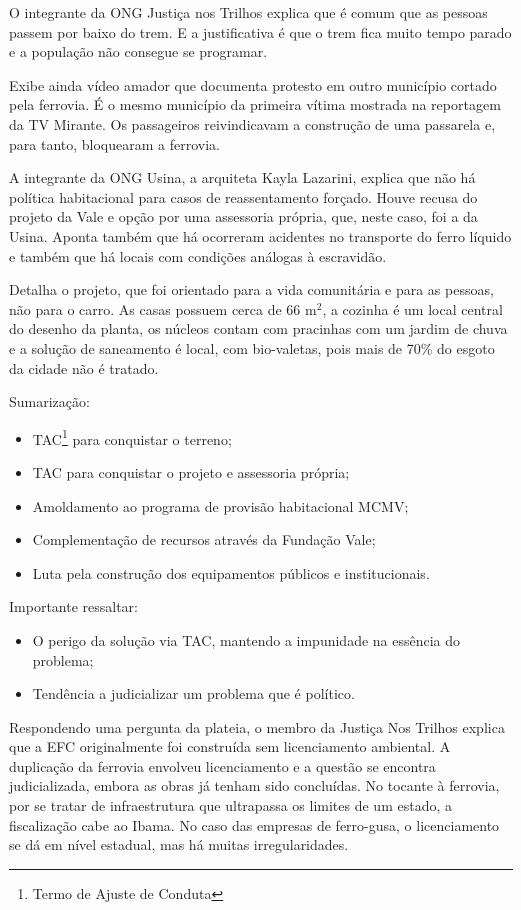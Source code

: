 \documentclass[
article,			%
11pt,				%
oneside,			%
a4paper,			%
english,			%
brazil,				%
sumario=tradicional
]{abntex2}
\begin{document}
	O integrante da ONG Justiça nos Trilhos explica que é comum que as pessoas passem por baixo do trem. E a justificativa é que o trem fica muito tempo parado e a população não consegue se programar.
	
	Exibe ainda vídeo amador que documenta protesto em outro município cortado pela ferrovia. É o mesmo município da primeira vítima mostrada na reportagem da TV Mirante. Os passageiros reivindicavam a construção de uma passarela e, para tanto, bloquearam a ferrovia.
	
	A integrante da ONG Usina, a arquiteta Kayla Lazarini, explica que não há política habitacional para casos de reassentamento forçado. Houve recusa do projeto da Vale e opção por uma assessoria própria, que, neste caso, foi a da Usina. Aponta também que há ocorreram acidentes no transporte do ferro líquido e também que há locais com condições análogas à escravidão.
	
	Detalha o projeto, que foi orientado para a vida comunitária e para as pessoas, não para o carro. As casas possuem cerca de 66 m$^{2}$, a cozinha é um local central do desenho da planta, os núcleos contam com pracinhas com um jardim de chuva e a solução de saneamento é local, com bio-valetas, pois mais de 70\% do esgoto da cidade não é tratado.
	
	Sumarização:
	\begin{itemize}
		\item TAC\footnote{Termo de Ajuste de Conduta} para conquistar o terreno;
		\item TAC para conquistar o projeto e assessoria própria;
		\item Amoldamento ao programa de provisão habitacional MCMV;
		\item Complementação de recursos através da Fundação Vale;
		\item Luta pela construção dos equipamentos públicos e institucionais.
	\end{itemize}
	
	Importante ressaltar:
	\begin{itemize}
		\item O perigo da solução via TAC, mantendo a impunidade na essência do problema;
		\item Tendência a judicializar um problema que é político.
	\end{itemize}
	
	Respondendo uma pergunta da plateia, o membro da Justiça Nos Trilhos explica que a EFC originalmente foi construída sem licenciamento ambiental. A duplicação da ferrovia envolveu licenciamento e a questão se encontra judicializada, embora as obras já tenham sido concluídas. No tocante à ferrovia, por se tratar de infraestrutura que ultrapassa os limites de um estado, a fiscalização cabe ao Ibama. No caso das empresas de ferro-gusa, o licenciamento se dá em nível estadual, mas há muitas irregularidades.
	
\end{document}
